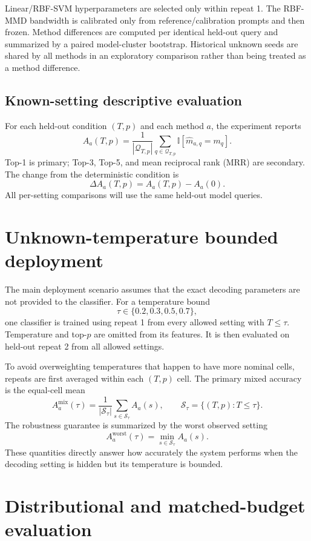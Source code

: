 \documentclass[11pt,a4paper]{article}
\begin{document}
Linear/RBF-SVM hyperparameters are selected only within repeat 1. The RBF-MMD
bandwidth is calibrated only from reference/calibration prompts and then frozen.
Method differences are computed per identical held-out query and summarized by
a paired model-cluster bootstrap. Historical unknown seeds are shared by all
methods in an exploratory comparison rather than being treated as a method
difference.

\subsection{Known-setting descriptive evaluation}

For each held-out condition $(T,p)$ and each method $a$, the experiment reports
\[
  A_a(T,p)=\frac{1}{|\mathcal{Q}_{T,p}|}
  \sum_{q\in\mathcal{Q}_{T,p}}\mathbb{I}[\widehat{m}_{a,q}=m_q].
\]
Top-1 is primary; Top-3, Top-5, and mean reciprocal rank (MRR) are secondary.
The change from the deterministic condition is
\[
  \Delta A_a(T,p)=A_a(T,p)-A_a(0).
\]
All per-setting comparisons will use the same held-out model queries.

\section{Unknown-temperature bounded deployment}

The main deployment scenario assumes that the exact decoding parameters are
not provided to the classifier. For a temperature bound
\[
  \tau\in\{0.2,0.3,0.5,0.7\},
\]
one classifier is trained using repeat 1 from every allowed setting with
$T\leq\tau$. Temperature and top-$p$ are omitted from its features. It is
then evaluated on held-out repeat 2 from all allowed settings.

To avoid overweighting temperatures that happen to have more nominal cells,
repeats are first averaged within each $(T,p)$ cell. The primary mixed accuracy
is the equal-cell mean
\[
  A_a^{\mathrm{mix}}(\tau)
  =\frac{1}{|\mathcal{S}_\tau|}
   \sum_{s\in\mathcal{S}_\tau} A_a(s),
  \qquad
  \mathcal{S}_\tau=\{(T,p):T\leq\tau\}.
\]
The robustness guarantee is summarized by the worst observed setting
\[
  A_a^{\mathrm{worst}}(\tau)
  =\min_{s\in\mathcal{S}_\tau} A_a(s).
\]
These quantities directly answer how accurately the system performs when the
decoding setting is hidden but its temperature is bounded.

\section{Distributional and matched-budget evaluation}
\end{document}
